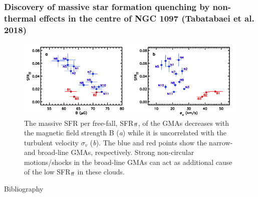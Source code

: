 \documentclass[10pt,aspectratio=169]{beamer}
\begin{document}
\begin{frame}
	\frametitle{Discovery of massive star formation quenching by non-thermal effects in the centre of NGC 1097 (Tabatabaei et al. 2018)}
	\begin{figure}
		\begin{center}
			\includegraphics[width=1.\textwidth]{./images/taba2018_SFR.png}
			\caption[]{The massive SFR per free-fall, SFR$_{\rm ff}$, of the GMAs decreases with the magnetic field strength B ({\it a}) while it is uncorrelated with the turbulent velocity $\sigma_v$ ({\it b}).  The blue and red points show the narrow-  and broad-line GMAs, respectively. Strong non-circular motions/shocks in the broad-line GMAs can act as additional cause of the low SFR$_{\rm ff}$ in these clouds.}
		\end{center}
	\end{figure}
\end{frame}
\begin{frame}{Bibliography}
		
		
\end{frame}
\end{document}
